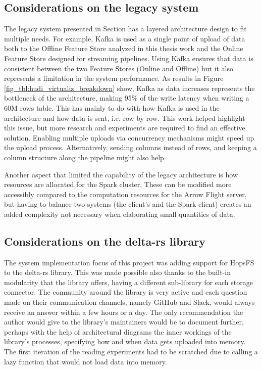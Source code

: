 \subsection{Considerations on the legacy system}

The legacy system presented in Section  has a layered architecture design to fit multiple needs. For example, Kafka is used as a single point of upload of data both to the Offline Feature Store analyzed in this thesis work and the Online Feature Store designed for streaming pipelines. Using Kafka ensures that data is consistent between the two Feature Stores (Online and Offline) but it also represents a limitation in the system performance. As results in Figure \ref{fig_tbl:hudi_virtualiz_breakdown} show, Kafka as data increases represents the bottleneck of the architecture, making 95\% of the write latency when writing a 60M rows table. This has mainly to do with how Kafka is used in the architecture and how data is sent, i.e. row by row. 
This work helped highlight this issue, but more research and experiments are required to find an effective solution. Enabling multiple uploads via concurrency mechanisms might speed up the upload process. Alternatively, sending columns instead of rows, and keeping a column structure along the pipeline might also help. 

Another aspect that limited the capability of the legacy architecture is how resources are allocated for the Spark cluster. These can be modified more accessibly compared to the computation resources for the Arrow Flight server, but having to balance two systems (the client's and the Spark client) creates an added complexity not necessary when elaborating small quantities of data.

\subsection{Considerations on the delta-rs library}

The system implementation focus of this project was adding support for \gls{HopsFS} to the delta-rs library. This was made possible also thanks to the built-in modularity that the library offers, having a different sub-library for each storage connector. The community around the library is very active and each question made on their communication channels, namely GitHub and Slack, would always receive an answer within a few hours or a day. The only recommendation the author would give to the library's maintainers would be to document further, perhaps with the help of architectural diagrams the inner workings of the library's processes, specifying how and when data gets uploaded into memory. The first iteration of the reading experiments had to be scratched due to calling a lazy function that would not load data into memory. 

